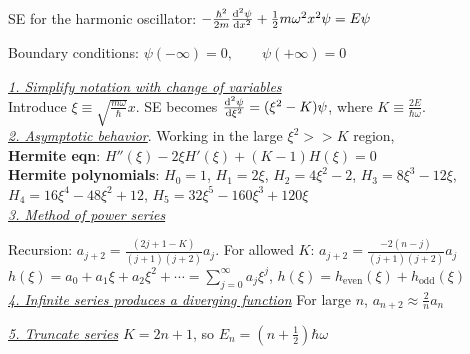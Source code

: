 SE for the harmonic oscillator: $-\frac{\hbar^2}{2m} \dv[2]{\psi}{x} + \frac{1}{2} m \omega^2 x^2 \psi = E \psi$

Boundary conditions: $\psi(-\infty) = 0, \qquad \psi(+\infty) = 0$

\smallskip

\textit{\underline{1. Simplify notation with change of variables}} \\
Introduce $\xi \equiv \sqrt{\frac{m \omega}{\hbar}} x$.
SE becomes $\dv[2]{\psi}{\xi} = (\xi^2 - K) \psi$, where $K \equiv \frac{2E}{\hbar \omega}$. \\

\textit{\underline{2. Asymptotic behavior}}.
Working in the large $\xi^2 >> K$ region, \\
\textbf{Hermite eqn}: $H''(\xi) - 2 \xi H'(\xi) + (K - 1) H(\xi) = 0$ \\

\textbf{Hermite polynomials}: $H_0 = 1$, $H_1 = 2 \xi$, $H_2 = 4 \xi^2 - 2$, $H_3 = 8 \xi^3 - 12 \xi$, $H_4 = 16 \xi^4 - 48 \xi^2 + 12$, $H_5 = 32 \xi^5 - 160 \xi^3 + 120 \xi$ \\

\textit{\underline{3. Method of power series}}


Recursion: $a_{j+2} = \frac{(2j + 1 - K)}{(j + 1)(j + 2)} a_j$. For allowed $K$: $a_{j+2} = \frac{-2(n - j)}{(j+1)(j+2)} a_j$ \\

$h(\xi) = a_0 + a_1 \xi + a_2 \xi^2 + \cdots = \sum_{j=0}^{\infty} a_j \xi^j$,
$h(\xi) = h_{\text{even}}(\xi) + h_{\text{odd}}(\xi)$ \\




\textit{\underline{4. Infinite series produces a diverging function}}
For large $n$, $a_{n+2} \approx \frac{2}{n} a_n$ 

\textit{\underline{5. Truncate series}} $K = 2n + 1$, so $E_n = (n + \frac{1}{2}) \hbar \omega$

